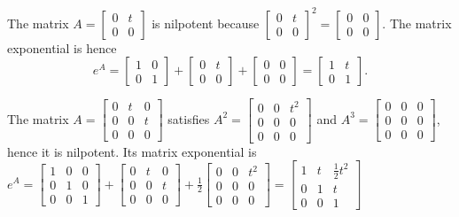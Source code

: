 \documentclass[10pt]{article}
\theoremstyle{plain}
\theoremstyle{box}
\begin{document}
The matrix $A=
\begin{bmatrix}
 0 & t \\
 0 & 0
\end{bmatrix}
$ is nilpotent because 
$
\begin{bmatrix}
 0 & t \\
 0 & 0
\end{bmatrix}
^2
=
\begin{bmatrix}
 0 & 0 \\
 0 & 0
\end{bmatrix}
$. 
The matrix exponential is hence 
$$e^A = 
\begin{bmatrix}
 1 & 0 \\
 0 & 1
\end{bmatrix}
+
\begin{bmatrix}
 0 & t \\
 0 & 0
\end{bmatrix}
+
\begin{bmatrix}
 0 & 0 \\
 0 & 0
\end{bmatrix}
=
\begin{bmatrix}
 1 & t \\
 0 & 1
\end{bmatrix}
.
$$

The matrix $A=
\begin{bmatrix}
 0 & t & 0 \\
 0 & 0 & t \\
 0 & 0 & 0
\end{bmatrix}
$ satisfies $A^2 = 
\begin{bmatrix}
 0 & 0 & t^2 \\
 0 & 0 & 0 \\
 0 & 0 & 0
\end{bmatrix}
$ and
$A^3 = 
\begin{bmatrix}
 0 & 0 & 0 \\
 0 & 0 & 0 \\
 0 & 0 & 0
\end{bmatrix}
$, hence it is nilpotent. Its matrix exponential is
$e^A=
\begin{bmatrix}
 1 & 0 & 0 \\
 0 & 1 & 0 \\
 0 & 0 & 1
\end{bmatrix}
+
\begin{bmatrix}
 0 & t & 0 \\
 0 & 0 & t \\
 0 & 0 & 0
\end{bmatrix}
+\frac{1}{2}
\begin{bmatrix}
 0 & 0 & t^2 \\
 0 & 0 & 0 \\
 0 & 0 & 0
\end{bmatrix}
=
\begin{bmatrix}
 1 & t & \frac{1}{2}t^2 \\
 0 & 1 & t \\
 0 & 0 & 1
\end{bmatrix}
$
\end{document}
